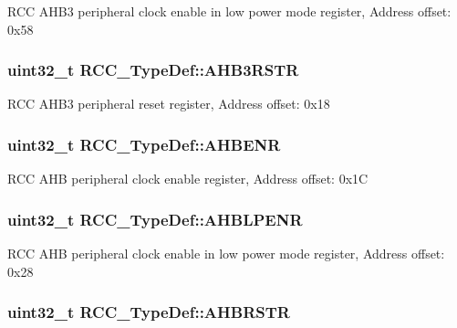 R\-C\-C A\-H\-B3 peripheral clock enable in low power mode register, Address offset\-: 0x58 \hypertarget{struct_r_c_c___type_def_a39a90d838fbd0b8515f03e4a1be6374f}{
\subsubsection[{A\-H\-B3\-R\-S\-T\-R}]{ uint32\-\_\-t R\-C\-C\-\_\-\-Type\-Def\-::\-A\-H\-B3\-R\-S\-T\-R}}\label{struct_r_c_c___type_def_a39a90d838fbd0b8515f03e4a1be6374f}
R\-C\-C A\-H\-B3 peripheral reset register, Address offset\-: 0x18 \hypertarget{struct_r_c_c___type_def_abaebc9204bbc1708356435a5a01e70eb}{
\subsubsection[{A\-H\-B\-E\-N\-R}]{ uint32\-\_\-t R\-C\-C\-\_\-\-Type\-Def\-::\-A\-H\-B\-E\-N\-R}}\label{struct_r_c_c___type_def_abaebc9204bbc1708356435a5a01e70eb}
R\-C\-C A\-H\-B peripheral clock enable register, Address offset\-: 0x1\-C \hypertarget{struct_r_c_c___type_def_a5a89bd730b7710a0e24d068cb6e4c90f}{
\subsubsection[{A\-H\-B\-L\-P\-E\-N\-R}]{ uint32\-\_\-t R\-C\-C\-\_\-\-Type\-Def\-::\-A\-H\-B\-L\-P\-E\-N\-R}}\label{struct_r_c_c___type_def_a5a89bd730b7710a0e24d068cb6e4c90f}
R\-C\-C A\-H\-B peripheral clock enable in low power mode register, Address offset\-: 0x28 \hypertarget{struct_r_c_c___type_def_a46a098b026c5e85770e7a7f05a35d49c}{
\subsubsection[{A\-H\-B\-R\-S\-T\-R}]{ uint32\-\_\-t R\-C\-C\-\_\-\-Type\-Def\-::\-A\-H\-B\-R\-S\-T\-R}}\label{struct_r_c_c___type_def_a46a098b026c5e85770e7a7f05a35d49c}
